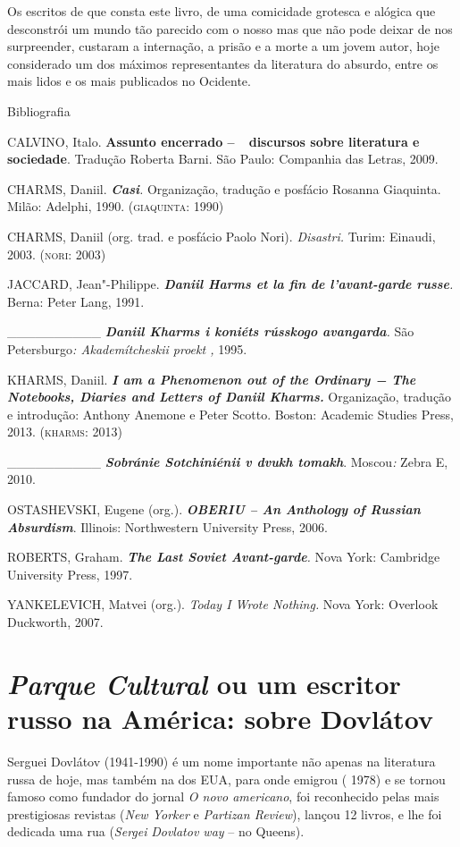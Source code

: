 Os escritos de que consta este livro, de uma comicidade grotesca e
alógica que desconstrói um mundo tão parecido com o nosso mas que não
pode deixar de nos surpreender, custaram a internação, a prisão e a
morte a um jovem autor, hoje considerado um dos máximos representantes
da literatura do absurdo, entre os mais lidos e os mais publicados no
Ocidente.

Bibliografia

CALVINO, Italo. \textbf{Assunto encerrado --~~discursos sobre literatura
e sociedade}. Tradução Roberta Barni. São Paulo: Companhia das Letras,
2009.

CHARMS, Daniil. \emph{\textbf{Casi}.} Organização, tradução e posfácio
Rosanna Giaquinta. Milão: Adelphi, 1990. (\textsc{giaquinta}: 1990)

CHARMS, Daniil (org. trad. e posfácio Paolo Nori). \emph{Disastri.}
Turim: Einaudi, 2003. (\textsc{nori}: 2003)

JACCARD, Jean"-Philippe. \emph{\textbf{Daniil Harms et la fin de
l'avant-garde russe}.} Berna: Peter Lang, 1991.~

\_\_\_\_\_\_\_\_\_\_ \emph{\textbf{Daniil Kharms i koniéts rússkogo
avangarda}.} São Petersburgo\emph{: Akademítcheskii proekt ,} 1995.

KHARMS, Daniil. \emph{\textbf{I am a Phenomenon out of the Ordinary −
The Notebooks, Diaries and Letters of Daniil Kharms.}} Organização,
tradução e introdução: Anthony Anemone e Peter Scotto. Boston: Academic
Studies Press, 2013. (\textsc{kharms}: 2013)

\_\_\_\_\_\_\_\_\_\_ \emph{\textbf{Sobránie Sotchiniénii v dvukh
tomakh}}. Moscou\emph{:} Zebra E, 2010.

OSTASHEVSKI, Eugene (org.). \emph{\textbf{OBERIU -- An Anthology of
Russian Absurdism}}. Illinois: Northwestern University Press, 2006.

ROBERTS, Graham. \emph{\textbf{The Last Soviet Avant-garde}.} Nova York:
Cambridge University Press, 1997.

YANKELEVICH, Matvei (org.). \emph{Today I Wrote Nothing.} Nova York:
Overlook Duckworth, 2007.

\chapter{\emph{Parque Cultural} ou um escritor russo na América: sobre 
Dovlátov}

Serguei Dovlátov (1941-1990) é um nome importante não apenas na
literatura russa de hoje, mas também na dos EUA, para onde emigrou (
1978) e se tornou famoso como fundador do jornal \emph{O novo
americano}, foi reconhecido pelas mais prestigiosas revistas (\emph{New
Yorker} e \emph{Partizan Review}), lançou 12 livros, e lhe foi dedicada
uma rua (\emph{Sergei} \emph{Dovlatov way} -- no Queens).

